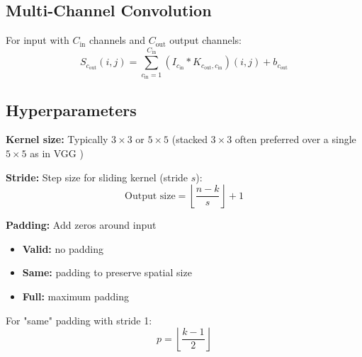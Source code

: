 \subsection{Multi-Channel Convolution}

For input with $C_{\text{in}}$ channels and $C_{\text{out}}$ output channels:
\begin{equation}
S_{c_{\text{out}}}(i,j) = \sum_{c_{\text{in}}=1}^{C_{\text{in}}} (I_{c_{\text{in}}} * K_{c_{\text{out}}, c_{\text{in}}})(i,j) + b_{c_{\text{out}}}
\end{equation}

\subsection{Hyperparameters}

\textbf{Kernel size:} Typically $3 \times 3$ or $5 \times 5$ (stacked $3\times3$ often preferred over a single $5\times5$ as in VGG \cite{GoodfellowEtAl2016})

\textbf{Stride:} Step size for sliding kernel (stride $s$):
\begin{equation}
\text{Output size} = \left\lfloor \frac{n - k}{s} \right\rfloor + 1
\end{equation}

\textbf{Padding:} Add zeros around input
\begin{itemize}
    \item \textbf{Valid:} no padding
    \item \textbf{Same:} padding to preserve spatial size
    \item \textbf{Full:} maximum padding
\end{itemize}

For "same" padding with stride 1:
\begin{equation}
p = \left\lfloor \frac{k-1}{2} \right\rfloor
\end{equation}


